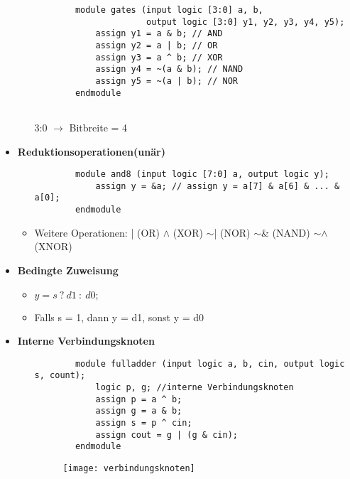 \begin{itemize}
\begin{itemize}
	\item[] 
		\begin{lstlisting}
		module gates (input logic [3:0] a, b,
					  output logic [3:0] y1, y2, y3, y4, y5);
			assign y1 = a & b; // AND
			assign y2 = a | b; // OR
			assign y3 = a ^ b; // XOR
			assign y4 = ~(a & b); // NAND
			assign y5 = ~(a | b); // NOR
		endmodule		
		
		\end{lstlisting}	
		
	\item [3:0] $\rightarrow$ Bitbreite = 4

	\end{itemize}
	
\item \textbf{Reduktionsoperationen(unär)}
	\begin{itemize}
	
	\item[]
		\begin{lstlisting}
		module and8 (input logic [7:0] a, output logic y);
			assign y = &a; // assign y = a[7] & a[6] & ... & a[0];
		endmodule	
		\end{lstlisting}	
		
	\item Weitere Operationen: | (OR)   $\wedge$ (XOR)   $\sim$| (NOR)   $\sim$\& (NAND)   $\sim\wedge$ (XNOR)
	
	\end{itemize}
	
\item \textbf{Bedingte Zuweisung}
	\begin{itemize}
	\item $y = s ~ ? ~ d1~:~d0;$
	\item Falls s = 1, dann y = d1, sonst y = d0
	\end{itemize}

\item \textbf{Interne Verbindungsknoten}
	\begin{itemize}
	\item[]
		\begin{lstlisting}
		module fulladder (input logic a, b, cin, output logic s, count);
			logic p, g; //interne Verbindungsknoten
			assign p = a ^ b;
			assign g = a & b;
			assign s = p ^ cin;
			assign cout = g | (g & cin);
		endmodule
		\end{lstlisting}
		
	\item[] \begin{figure}[H]
				\begin{center}
				\texttt{[image: verbindungsknoten]}
				\end{center}
			\end{figure}
	\end{itemize}
	

\end{itemize}

